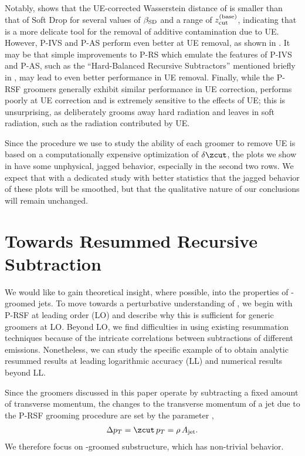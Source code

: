 \documentclass[letterpaper,11pt]{article}
\begin{document}
Notably,  shows that the UE-corrected Wasserstein distance of  is smaller than that of Soft Drop for several values of \(\beta_{\rm SD}\) and a range of \(z_{\rm cut}^{\rm (base)}\), indicating that  is a more delicate tool for the removal of additive contamination due to UE.
%
However, P-IVS and P-AS perform even better at UE removal, as shown in .
%
It may be that simple improvements to P-RS which emulate the features of P-IVS and P-AS, such as the ``Hard-Balanced Recursive Subtractors'' mentioned briefly in , may lead to even better performance in UE removal.
%
Finally, while the P-RSF groomers generally exhibit similar performance in UE correction,  performs poorly at UE correction and is extremely sensitive to the effects of UE;
%
this is unsurprising, as  deliberately grooms away hard radiation and leaves in soft radiation, such as the radiation contributed by UE.

Since the procedure we use to study the ability of each groomer to remove UE is based on a computationally expensive optimization of \(\delta\zcut\), the plots we show in  have some unphysical, jagged behavior, especially in the second two rows.
%
We expect that with a dedicated study with better statistics that the jagged behavior of these plots will be smoothed, but that the qualitative nature of our conclusions will remain unchanged.


\section{Towards Resummed Recursive Subtraction}
\label{app:calc}
We would like to gain theoretical insight, where possible, into the properties of \PIRANHA{}-groomed jets.
%
To move towards a perturbative understanding of \PIRANHA{}, we begin with P-RSF at leading order (LO) and describe why this is sufficient for generic \PIRANHA{} groomers at LO.
%
Beyond LO, we find difficulties in using existing resummation techniques because of the intricate correlations between subtractions of different emissions.
%
Nonetheless, we can study the specific example of  to obtain analytic resummed results at leading logarithmic accuracy (LL) and numerical results beyond LL.

Since the \PIRANHA{} groomers discussed in this paper operate by subtracting a fixed amount of transverse momentum, the changes to the transverse momentum of a jet due to the P-RSF grooming procedure are set by the parameter \zcut{},
\begin{align}
    \Delta p_T = \zcut\,p_T = \rho\,A_{\rm jet}
    .
\end{align}
%
We therefore focus on \PIRANHA{}-groomed substructure, which has non-trivial behavior.
\end{document}
